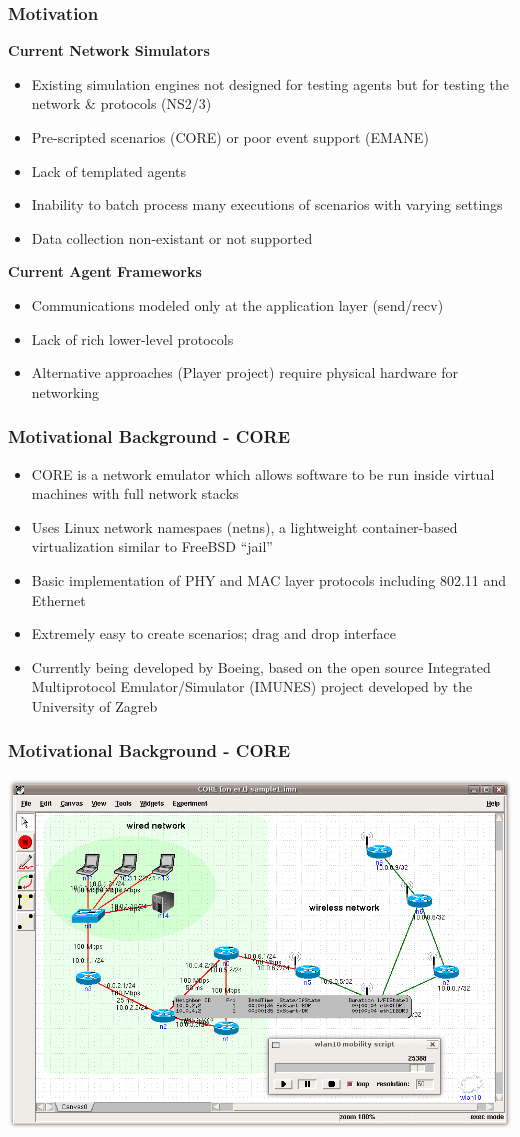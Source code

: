 \documentclass[mathserif]{beamer}
\begin{document}
\frame
{
    \frametitle{Motivation}
    \textbf{Current Network Simulators}
    \begin{itemize}
	\item Existing simulation engines not designed for testing agents but for testing the network \& protocols (NS2/3)
	\item Pre-scripted scenarios (CORE) or poor event support (EMANE)
	\item Lack of templated agents
	\item Inability to batch process many executions of scenarios with varying settings
	\item Data collection non-existant or not supported
    \end{itemize}
    \textbf{Current Agent Frameworks}
    \begin{itemize}
	\item Communications modeled only at the application layer (send/recv)
	\item Lack of rich lower-level protocols
	\item Alternative approaches (Player project) require physical hardware for networking
    \end{itemize}
}

\frame
{
    \frametitle{Motivational Background - CORE}
    \begin{itemize}
	\item CORE is a network emulator which allows software to be run inside virtual machines with full network stacks
	\item Uses Linux network namespaes (netns), a lightweight container-based virtualization similar to FreeBSD ``jail''
	\item Basic implementation of PHY and MAC layer protocols including 802.11 and Ethernet
	\item Extremely easy to create scenarios; drag and drop interface
	\item Currently being developed by Boeing, based on the open source Integrated Multiprotocol Emulator/Simulator (IMUNES) project developed by the University of Zagreb
    \end{itemize}
}

\frame
{
    \frametitle{Motivational Background - CORE}
    \begin{center}
        \includegraphics{core-screenshot.png}
    \end{center}
}
\end{document}
